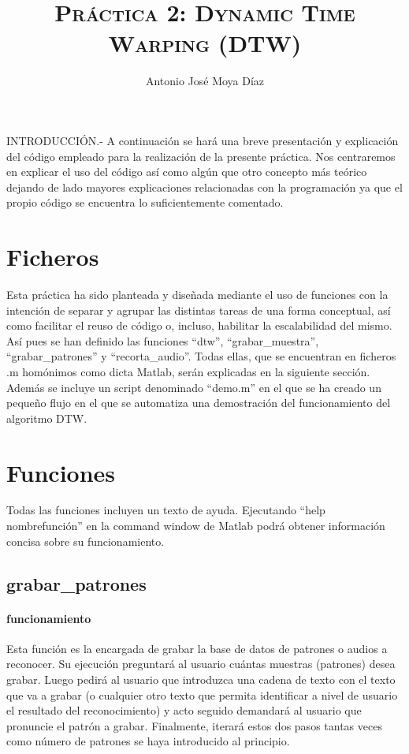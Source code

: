 \documentclass[10pt, a4paper]{article}
\title{\textsc{Práctica 2: Dynamic Time Warping (DTW)}}
\author{Antonio José Moya Díaz}
\begin{document}
\maketitle %

INTRODUCCIÓN.- A continuación se hará una breve presentación y explicación del código empleado para la realización de la presente práctica. Nos centraremos en explicar el uso del código así como algún que otro concepto más teórico dejando de lado mayores explicaciones relacionadas con la programación ya que el propio código se encuentra lo suficientemente comentado. \\

\section{Ficheros}
Esta práctica ha sido planteada y diseñada mediante el uso de funciones con la intención de separar y agrupar las distintas tareas de una forma conceptual, así como facilitar el reuso de código o, incluso, habilitar la escalabilidad del mismo.\\

Así pues se han definido las funciones ``dtw'', ``grabar\_muestra'', ``grabar\_patrones'' y ``recorta\_audio''. Todas ellas, que se encuentran en ficheros .m homónimos como dicta Matlab, serán explicadas en la siguiente sección. Además se incluye un script denominado ``demo.m'' en el que se ha creado un pequeño flujo en el que se automatiza una demostración del funcionamiento del algoritmo DTW.

\section{Funciones}

Todas las funciones incluyen un texto de ayuda. Ejecutando ``help nombrefunción'' en la command window de Matlab podrá obtener información concisa sobre su funcionamiento.

\subsection*{grabar\_patrones} 
 
\paragraph{funcionamiento} Esta función es la encargada de grabar la base de datos de patrones o audios a reconocer. Su ejecución preguntará al usuario cuántas muestras (patrones) desea grabar. Luego pedirá al usuario que introduzca una cadena de texto con el texto que va a grabar (o cualquier otro texto que permita identificar a nivel de usuario el resultado del reconocimiento) y acto seguido demandará al usuario que pronuncie el patrón a grabar. Finalmente, iterará estos dos pasos tantas veces como número de patrones se haya introducido al principio.
\end{document}
